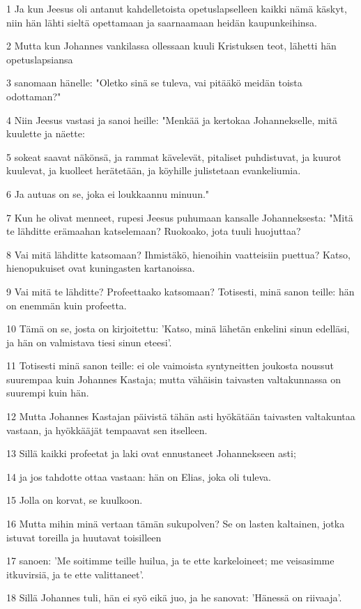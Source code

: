 \par 1 Ja kun Jeesus oli antanut kahdelletoista opetuslapselleen kaikki nämä käskyt, niin hän lähti sieltä opettamaan ja saarnaamaan heidän kaupunkeihinsa.
\par 2 Mutta kun Johannes vankilassa ollessaan kuuli Kristuksen teot, lähetti hän opetuslapsiansa
\par 3 sanomaan hänelle: "Oletko sinä se tuleva, vai pitääkö meidän toista odottaman?"
\par 4 Niin Jeesus vastasi ja sanoi heille: "Menkää ja kertokaa Johannekselle, mitä kuulette ja näette:
\par 5 sokeat saavat näkönsä, ja rammat kävelevät, pitaliset puhdistuvat, ja kuurot kuulevat, ja kuolleet herätetään, ja köyhille julistetaan evankeliumia.
\par 6 Ja autuas on se, joka ei loukkaannu minuun."
\par 7 Kun he olivat menneet, rupesi Jeesus puhumaan kansalle Johanneksesta: "Mitä te lähditte erämaahan katselemaan? Ruokoako, jota tuuli huojuttaa?
\par 8 Vai mitä lähditte katsomaan? Ihmistäkö, hienoihin vaatteisiin puettua? Katso, hienopukuiset ovat kuningasten kartanoissa.
\par 9 Vai mitä te lähditte? Profeettaako katsomaan? Totisesti, minä sanon teille: hän on enemmän kuin profeetta.
\par 10 Tämä on se, josta on kirjoitettu: 'Katso, minä lähetän enkelini sinun edelläsi, ja hän on valmistava tiesi sinun eteesi'.
\par 11 Totisesti minä sanon teille: ei ole vaimoista syntyneitten joukosta noussut suurempaa kuin Johannes Kastaja; mutta vähäisin taivasten valtakunnassa on suurempi kuin hän.
\par 12 Mutta Johannes Kastajan päivistä tähän asti hyökätään taivasten valtakuntaa vastaan, ja hyökkääjät tempaavat sen itselleen.
\par 13 Sillä kaikki profeetat ja laki ovat ennustaneet Johannekseen asti;
\par 14 ja jos tahdotte ottaa vastaan: hän on Elias, joka oli tuleva.
\par 15 Jolla on korvat, se kuulkoon.
\par 16 Mutta mihin minä vertaan tämän sukupolven? Se on lasten kaltainen, jotka istuvat toreilla ja huutavat toisilleen
\par 17 sanoen: 'Me soitimme teille huilua, ja te ette karkeloineet; me veisasimme itkuvirsiä, ja te ette valittaneet'.
\par 18 Sillä Johannes tuli, hän ei syö eikä juo, ja he sanovat: 'Hänessä on riivaaja'.
